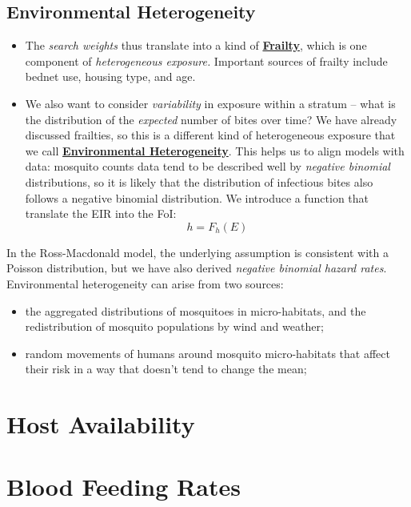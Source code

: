 \documentclass[
]{book}
\begin{document}
\subsection{Environmental Heterogeneity}\label{environmental-heterogeneity}

\begin{itemize}
\item
  The \emph{search weights} thus translate into a kind of \textbf{\hyperref[frailtyCh]{Frailty}}, which is one component of \emph{heterogeneous exposure.} Important sources of frailty include bednet use, housing type, and age.
\item
  We also want to consider \emph{variability} in exposure within a stratum -- what is the distribution of the \emph{expected} number of bites over time? We have already discussed frailties, so this is a different kind of heterogeneous exposure that we call \textbf{\hyperref[environmental-heterogeneity]{Environmental Heterogeneity}}. This helps us to align models with data: mosquito counts data tend to be described well by \emph{negative binomial} distributions, so it is likely that the distribution of infectious bites also follows a negative binomial distribution. We introduce a function that translate the EIR into the FoI:
  \[h=F_h(E)\]
\end{itemize}

In the Ross-Macdonald model, the underlying assumption is consistent with a Poisson distribution, but we have also derived \emph{negative binomial hazard rates}. Environmental heterogeneity can arise from two sources:

\begin{itemize}
\item
  the aggregated distributions of mosquitoes in micro-habitats, and the redistribution of mosquito populations by wind and weather;
\item
  random movements of humans around mosquito micro-habitats that affect their risk in a way that doesn't tend to change the mean;
\end{itemize}

\section{Host Availability}\label{host-availability}

\section{Blood Feeding Rates}\label{blood-feeding-rates}
\end{document}
